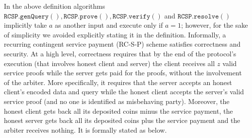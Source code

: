 In the above definition algorithms $\mathtt{RCSP}.\mathtt{genQuery}(),\mathtt{RCSP}.\mathtt{prove}(),\mathtt{RCSP}.\mathtt{verify}()$ and $\mathtt{RCSP}.\mathtt{resolve}()$ implicitly  take $a$ as another input and  execute only if $a=1$; however, for the sake of simplicity we  avoided explicitly stating it  in the definition. Informally, a recurring contingent service payment (RC-S-P)  scheme satisfies correctness and security. At a high level, correctness requires that by the end of the protocol's execution  (that involves  honest client and server) the client receives all $z$ valid service proofs while the server gets paid  for the proofs, without the involvement of the arbiter. More specifically, it requires that the server accepts an honest client's encoded data and query while the honest client accepts the server's valid service proof (and no one is identified as misbehaving party). Moreover, the honest client gets back all its deposited coins minus the service payment, the honest server gets back all its deposited coins  plus the service payment and the arbiter receives nothing. It is formally stated as below.



